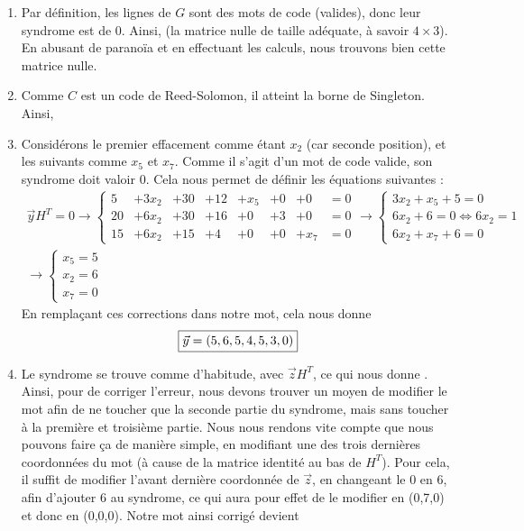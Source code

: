 \documentclass[10p,a4paper]{scrartcl}
\renewcommand{\(}{\left(}
\renewcommand{\)}{\right)}
\begin{document}
\begin{enumerate}
	\item	Par définition, les lignes de $G$ sont des mots de code (valides), donc leur syndrome est de 0. Ainsi,  (la matrice nulle de taille adéquate, à savoir $4\times 3$). En abusant de paranoïa et en effectuant les calculs, nous trouvons bien cette matrice nulle.
	
	\item	Comme $C$ est un code de Reed-Solomon, il atteint la borne de Singleton. Ainsi,\\
			
	\item	Considérons le premier effacement comme étant $x_2$ (car seconde position), et les suivants comme $x_5$ et $x_7$. Comme il s'agit d'un mot de code valide, son syndrome doit valoir 0. Cela nous permet de définir les équations suivantes :
			\begin{align*}
			\vec{y}H^T = 0 \to 
			\left\{\begin{array}{llllllll}
				5  & +3x_2 & +30 & +12 & +x_5 & +0 & +0 & =0\\
				20 & +6x_2 & +30 & +16 & +0 & +3 & +0 & =0\\
				15 & +6x_2 & +15 & +4 & +0 & +0 & +x_7 & = 0
			\end{array}\right. \to 
			\left\{\begin{array}{l}
				3x_2 + x_5 + 5 = 0\\
				6x_2  + 6= 0 \iff 6x_2 = 1\\
				6x_2 + x_7 + 6 = 0
			\end{array}\right.
			\\
			\to
			\left\{
			\begin{array}{l}
				x_5 = 5\\
				x_2 = 6\\
				x_7 = 0
			\end{array}\right.
			\end{align*}
			En remplaçant ces corrections dans notre mot, cela nous donne
			\begin{align*}
				\fbox{$\vec{y} = (5,6,5,4,5,3,0)$}
			\end{align*}
			
	\item	Le syndrome se trouve comme d'habitude, avec $\vec{z}H^T$, ce qui nous donne . Ainsi, pour de corriger l'erreur, nous devons trouver un moyen de modifier le mot afin de ne toucher que la seconde partie du syndrome, mais sans toucher à la première et troisième partie. Nous nous rendons vite compte que nous pouvons faire ça de manière simple, en modifiant une des trois dernières coordonnées du mot (à cause de la matrice identité au bas de $H^T$). Pour cela, il suffit de modifier l'avant dernière coordonnée de $\vec{z}$, en changeant le 0 en 6, afin d'ajouter 6 au syndrome, ce qui aura pour effet de le modifier en (0,7,0) et donc en (0,0,0). Notre mot ainsi corrigé devient 
	

\end{enumerate}
\end{document}
